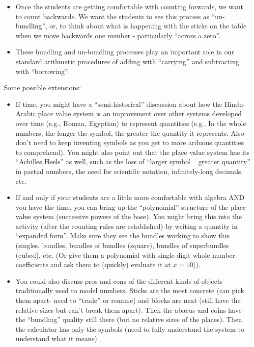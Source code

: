 \documentclass{ximera}
\begin{document}
\begin{instructorNotes}
\begin{itemize}
	\item Once the students are getting comfortable with counting forwards, we want to count backwards.  We want the students to see this process as ``un-bundling'', or, to think about what is happening with the sticks on the table when we move backwards one number - particularly ``across a zero''. 
	\item These bundling and un-bundling processes play an important role in our standard arithmetic procedures of adding with ``carrying'' and subtracting with ``borrowing''. 
\end{itemize}

Some possible extensions:

\begin{itemize}

    \item If time, you might have a ``semi-historical'' discussion about how the Hindu-Arabic place value system is an improvement over other systems developed over time (e.g., Roman, Egyptian) to represent quantities (e.g., In the whole numbers, the longer the symbol, the greater the quantity it represents.  Also don't need to keep inventing symbols as you get to more arduous quantities to comprehend).  You might also point out that the place value system has its ``Achilles Heels'' as well, such as the loss of ``larger symbol= greater quantity'' in partial numbers, the need for scientific notation, infinitely-long decimals, etc.  

     \item If and only if your students are a little more comfortable with algebra AND you have the time, you can bring up the ``polynomial'' structure of the place value system (successive powers of the base).  You might bring this into the activity (after the counting rules are established) by writing a quantity in ``expanded form''.  Make sure they see the bundles working to show this (singles, bundles, bundles of bundles (square), bundles of superbundles (cubed), etc. (Or give them a polynomial with single-digit whole number coefficients and ask them to (quickly) evaluate it at $x = 10$)).

     \item You could also discuss pros and cons of the different kinds of objects traditionally used to model numbers.  Sticks are the most concrete (can pick them apart- need to ``trade'' or rename) and blocks are next (still have the relative sizes but can't break them apart).  Then the abacus and coins have the ``bundling'' quality still there (but no relative sizes of the places).  Then the calculator has only the symbols (need to fully understand the system to understand what it means).
\end{itemize}


\end{instructorNotes}
\end{document}
